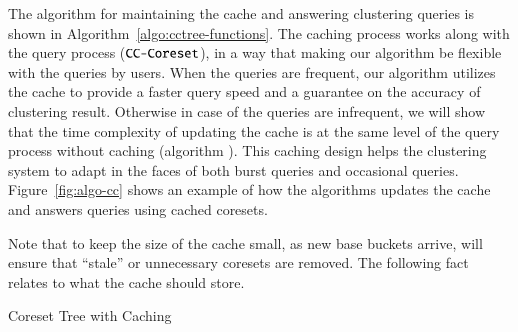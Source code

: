 The algorithm for maintaining the cache and answering clustering queries 
is shown in Algorithm~\ref{algo:cctree-functions}. 
The caching process works along with the query process ($\texttt{CC-Coreset}$), in a way that
making our algorithm be flexible with the queries by users. When the queries are frequent, 
our algorithm utilizes the cache to provide a faster query speed and a guarantee on the accuracy of 
clustering result. Otherwise in case of the queries are infrequent, we will show that the time complexity 
of updating the cache is at the same level of the query process without caching (algorithm \ct). 
This caching design helps the clustering system to adapt in the faces of both burst queries and occasional queries. 
Figure~\ref{fig:algo-cc} shows an example of how the \cc algorithms updates the cache and answers queries
using cached coresets.

Note that to keep the size of the cache small, as new base buckets arrive,
\ccupdate{} will ensure that ``stale'' or unnecessary coresets are removed. 
The following fact relates to what the cache should store.

\begin{algorithm}
  \caption{Coreset Tree with Caching}
  \label{algo:cctree-functions}
  \label{algo:cctree-init}
  \label{algo:cctree-update}
  \label{algo:cctree-coreset}
\end{algorithm}

